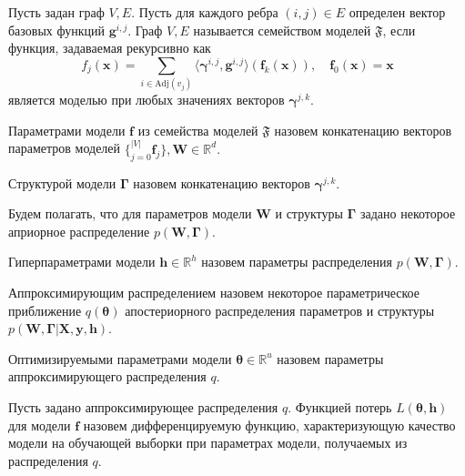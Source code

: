 \begin{defin}
Пусть задан граф $V,E$. Пусть для каждого ребра $(i,j) \in E$ определен вектор базовых функций $\mathbf{g}^{i,j}.$ Граф $V, E$ называется семейством моделей $\mathfrak{F}$, если функция, задаваемая рекурсивно как 
\[
    f_j(\mathbf{x}) = \sum_{i \in \text{Adj}(v_j)} \langle \boldsymbol{\gamma}^{i,j}, \mathbf{g}^{i,j} \rangle \left(\mathbf{f}_k(\mathbf{x})\right), \quad \mathbf{f}_0(\mathbf{x}) = \mathbf{x}
\]
является моделью при любых значениях векторов $\boldsymbol{\gamma}^{j,k}$.
\end{defin}

\begin{defin}
Параметрами модели $\mathbf{f}$ из семейства моделей $\mathfrak{F}$  назовем конкатенацию векторов параметров моделей $\{_{j=0}^|V| \mathbf{f}_j\}, \mathbf{W} \in \mathbb{R}^d.$
\end{defin}

\begin{defin}
Структурой модели $\boldsymbol{\Gamma}$ назовем конкатенацию векторов $\boldsymbol{\gamma}^{j,k}$.
\end{defin}

Будем полагать, что для параметров модели $\mathbf{W}$ и структуры  $\boldsymbol{\Gamma}$ задано некоторое априорное распределение $p(\mathbf{W}, \boldsymbol{\Gamma})$.
\begin{defin}
Гиперпараметрами модели $\mathbf{h}\in \mathbb{R}^h$ назовем параметры распределения $p(\mathbf{W}, \boldsymbol{\Gamma})$.
\end{defin}

\begin{defin}
Аппроксимирующим распределением назовем некоторое параметрическое приближение $q(\boldsymbol{\theta})$ апостериорного распределения параметров и структуры $p(\mathbf{W}, \boldsymbol{\Gamma}|\mathbf{X}, \mathbf{y}, \mathbf{h}).$ 
\end{defin}

\begin{defin}
Оптимизируемыми параметрами модели $\boldsymbol{\theta} \in \mathbb{R}^u$ назовем параметры аппроксимирующего распределения $q$.
\end{defin}

\begin{defin}
Пусть задано аппроксимирующее распределения $q$.
Функцией потерь $L(\boldsymbol{\theta}, \mathbf{h})$ для модели $\mathbf{f}$ назовем дифференцируемую функцию, характеризующую качество модели на обучающей выборки при параметрах модели, получаемых из  распределения $q$.
\end{defin}

